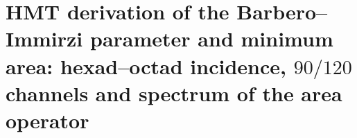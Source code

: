 \HMTFlushCurrentChapter
\chapter{HMT derivation of the Barbero--Immirzi parameter and minimum area: hexad--octad incidence, \(90/120\) channels and spectrum of the area operator}%
\begingroup
\renewcommand{\chapter}[2][]{}%
%
\endgroup


\HMTFlushCurrentChapter


\HMTFlushCurrentChapter
\chapter{Genealogical classification of numbers: surviving sections, invariants and atlas of constants}%
\begingroup
\renewcommand{\chapter}[2][]{}%
%
\endgroup

\HMTFlushCurrentChapter
\chapter{Genealogical completeness of HMT sections and decidability of each finite level}%
\begingroup
\renewcommand{\chapter}[2][]{}%
%
\endgroup

\HMTFlushCurrentChapter
\chapter{Gödel--Turing obstruction to uniform decision of projective multiplicities}%
\begingroup
\renewcommand{\chapter}[2][]{}%
%
\endgroup

